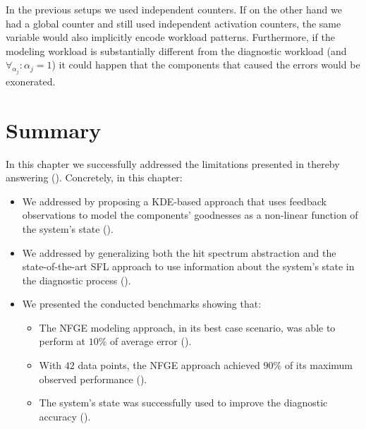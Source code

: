 In the previous setups we used independent counters.
%
If on the other hand we had a global counter and still used
independent activation counters, the same variable would also
implicitly encode workload patterns.
%
Furthermore, if the modeling workload is substantially different from
the diagnostic workload (and $\forall_{\alpha_j} : \alpha_j = 1$) it
could happen that the components that caused the errors would be
exonerated.


\section{Summary}
\label{sec:nfge:summary}
In this chapter we successfully addressed the limitations presented in
 thereby
answering
().
%
Concretely, in this chapter:
\begin{itemize}[nolistsep]
\item We addressed  by proposing a \ac{KDE}-based
  approach that uses feedback observations to model the components'
  goodnesses as a non-linear function of the system's state
  ().
\item We addressed  by generalizing both the hit
  spectrum abstraction and the state-of-the-art \ac{SFL} approach to
  use information about the system's state in the diagnostic process
  ().
\item We presented the conducted benchmarks showing that:
  \begin{itemize}
  \item The \ac{NFGE} modeling approach, in its best case scenario,
    was able to perform at $10\%$ of average
    error ().
  \item With $42$ data points, the \ac{NFGE} approach achieved $90\%$
    of its maximum observed performance
    ().
  \item The system's state was successfully used to improve the
    diagnostic accuracy ().
  \end{itemize}
\end{itemize}

